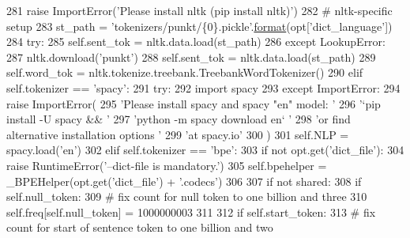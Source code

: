 \begin{DoxyCode}
281                 \textcolor{keywordflow}{raise} ImportError(\textcolor{stringliteral}{'Please install nltk (pip install nltk)'})
282             \textcolor{comment}{# nltk-specific setup}
283             st\_path = \textcolor{stringliteral}{'tokenizers/punkt/\{0\}.pickle'}.\hyperlink{namespaceparlai_1_1chat__service_1_1services_1_1messenger_1_1shared__utils_a32e2e2022b824fbaf80c747160b52a76}{format}(opt[\textcolor{stringliteral}{'dict\_language'}])
284             \textcolor{keywordflow}{try}:
285                 self.sent\_tok = nltk.data.load(st\_path)
286             \textcolor{keywordflow}{except} LookupError:
287                 nltk.download(\textcolor{stringliteral}{'punkt'})
288                 self.sent\_tok = nltk.data.load(st\_path)
289             self.word\_tok = nltk.tokenize.treebank.TreebankWordTokenizer()
290         \textcolor{keywordflow}{elif} self.tokenizer == \textcolor{stringliteral}{'spacy'}:
291             \textcolor{keywordflow}{try}:
292                 \textcolor{keyword}{import} spacy
293             \textcolor{keywordflow}{except} ImportError:
294                 \textcolor{keywordflow}{raise} ImportError(
295                     \textcolor{stringliteral}{'Please install spacy and spacy "en" model: '}
296                     \textcolor{stringliteral}{'`pip install -U spacy && '}
297                     \textcolor{stringliteral}{'python -m spacy download en` '}
298                     \textcolor{stringliteral}{'or find alternative installation options '}
299                     \textcolor{stringliteral}{'at spacy.io'}
300                 )
301             self.NLP = spacy.load(\textcolor{stringliteral}{'en'})
302         \textcolor{keywordflow}{elif} self.tokenizer == \textcolor{stringliteral}{'bpe'}:
303             \textcolor{keywordflow}{if} \textcolor{keywordflow}{not} opt.get(\textcolor{stringliteral}{'dict\_file'}):
304                 \textcolor{keywordflow}{raise} RuntimeError(\textcolor{stringliteral}{'--dict-file is mandatory.'})
305             self.bpehelper = \_BPEHelper(opt.get(\textcolor{stringliteral}{'dict\_file'}) + \textcolor{stringliteral}{'.codecs'})
306 
307         \textcolor{keywordflow}{if} \textcolor{keywordflow}{not} shared:
308             \textcolor{keywordflow}{if} self.null\_token:
309                 \textcolor{comment}{# fix count for null token to one billion and three}
310                 self.freq[self.null\_token] = 1000000003
311 
312             \textcolor{keywordflow}{if} self.start\_token:
313                 \textcolor{comment}{# fix count for start of sentence token to one billion and two}

\end{DoxyCode}
